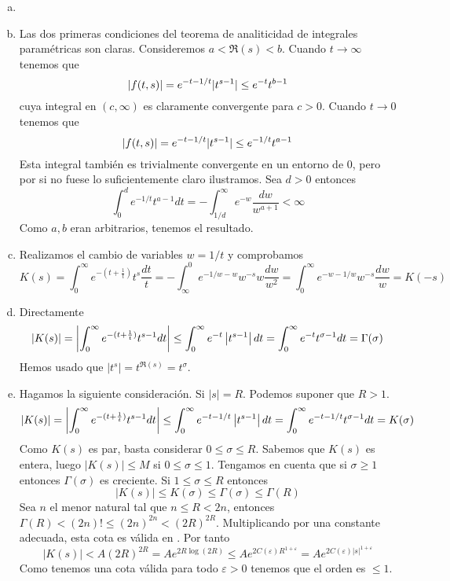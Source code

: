 \documentclass[twoside]{article}
\begin{document}
\begin{solucion}
\begin{enumerate}[a)]
\item[]
\item Las dos primeras condiciones del teorema de analiticidad de integrales paramétricas son claras. Consideremos $a<\Re(s)<b$. Cuando $t\to \infty$ tenemos que
$$
\left\lvert f(t,s)\right\rvert = e^{-t -1/t}|t^{s-1}| \leq e^{-t}t^{b-1}
$$
cuya integral en $(c,\infty)$ es claramente convergente para $c>0$. Cuando $t\to 0$ tenemos que
$$
\left\lvert f(t,s)\right\rvert = e^{-t-1/t}|t^{s-1}| \leq e^{-1/t}t^{a-1}
$$
Esta integral también es trivialmente convergente en un entorno de 0, pero por si no fuese lo suficientemente claro ilustramos. Sea $d>0$ entonces
$$
\int_0^d e^{-1/t}t^{a-1} dt = -\int_{1/d}^\infty e^{-w}\frac{dw}{w^{a+1}}<\infty
$$
Como $a,b$ eran arbitrarios, tenemos el resultado.
\item Realizamos el cambio de variables $w=1/t$ y comprobamos
$$
K(s) =\int_0^\infty e^{-(t+\frac{1}{t})}t^s\frac{dt}{t} = - \int_\infty^0 e^{-1/w-w}w^{-s}w \frac{dw}{w^2} = \int_0^\infty e^{-w-1/w}w^{-s}\frac{dw}{w} = K(-s)
$$
\item Directamente
$$
|K(s)| = \left\lvert\int_0^\infty e^{-(t+\frac{1}{t})}t^{s-1}dt\right\rvert\leq \int_0^\infty e^{-t}\left\lvert t^{s-1}\right\rvert dt = \int_0^\infty e^{-t}{t^{\sigma-1}}dt = \Gamma(\sigma)
$$
Hemos usado que $|t^{s}| = t^{\Re(s)} = t^\sigma$.
\item Hagamos la siguiente consideración. Si $|s|= R$. Podemos suponer que $R>1$.
$$
|K(s)| = \left\lvert\int_0^\infty e^{-(t+\frac{1}{t})}t^{s-1}dt\right\rvert\leq \int_0^\infty e^{-t-1/t}\left\lvert t^{s-1}\right\rvert dt = \int_0^\infty e^{-t-1/t}{t^{\sigma-1}}dt = K(\sigma)
$$
Como $K(s)$ es par, basta considerar $0\leq \sigma \leq R$. Sabemos que $K(s)$ es entera, luego $|K(s)| \leq M$ si $0\leq \sigma \leq 1$. Tengamos en cuenta que si $\sigma \geq 1$ entonces $\Gamma(\sigma)$ es creciente. Si $1\leq \sigma \leq R$ entonces 
$$|K(s)|\leq K(\sigma)\leq \Gamma(\sigma) \leq \Gamma(R)$$ Sea $n$ el menor natural tal que $n\leq R < 2n$, entonces $\Gamma(R) < (2n)! \leq (2n)^{2n} < (2R)^{2R}$. Multiplicando por una constante adecuada, esta cota es válida en . Por tanto
$$
|K(s)| < A(2R)^{2R} = Ae^{2R\log(2R)} \leq Ae^{2C(\varepsilon)R^{1+\varepsilon}}= Ae^{2C(\varepsilon)|s|^{1+\varepsilon}}
$$
Como tenemos una cota válida para todo $\varepsilon>0$ tenemos que el orden es $\leq 1$.
\end{enumerate}
\end{solucion}
\newpage
\end{document}
